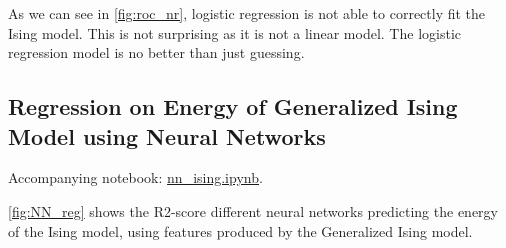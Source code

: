 As we can see in \cref{fig:roc_nr}, logistic regression is not able to correctly fit the Ising model. This is not surprising as it is not a linear model. The logistic regression model is no better than just guessing.

\subsection{Regression on Energy of Generalized Ising Model using Neural Networks}\label{sec:results NN reg}
Accompanying notebook: \href{https://github.com/nicolossus/FYS-STK4155-Project2/blob/master/notebooks/nn_ising.ipynb}{nn\_ising.ipynb}.

\autoref{fig:NN_reg} shows the R2-score different neural networks predicting the energy of the Ising model, using features produced by the Generalized Ising model.

